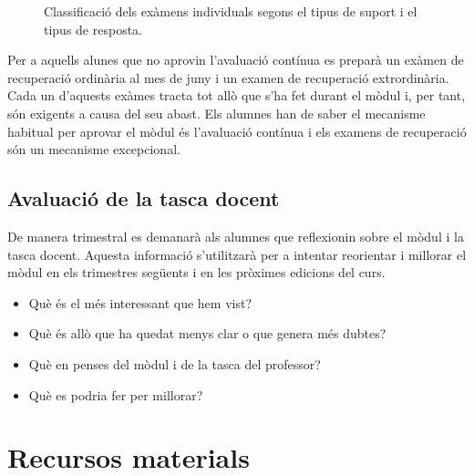 \documentclass[catalan, a4paper, 12pt, titlepage]{article}
\begin{document}
\begin{figure}
\centering
{}
\caption{Classificació dels exàmens individuals segons el tipus de suport i el tipus de resposta.} \label{fig:M1}
\end{figure}

Per a aquells alunes que no aprovin l'avaluació contínua es preparà un exàmen de recuperació ordinària al mes de juny i un examen de recuperació extrordinària. Cada un d'aquests exàmes tracta tot allò que s'ha fet durant el mòdul i, per tant, són exigents a causa del seu abast. Els alumnes han de saber el mecanisme habitual per aprovar el mòdul és l'avaluació contínua i els examens de recuperació són un mecanisme excepcional.

\subsection{Avaluació de la tasca docent}

De manera trimestral es demanarà als alumnes que reflexionin sobre el mòdul i la tasca docent. Aquesta informació s'utilitzarà per a intentar reorientar i millorar el mòdul en els trimestres següents i en les pròximes edicions del curs. 

\begin{itemize}
	\item Què és el més interessant que hem vist?
	\item Què és allò que ha quedat menys clar o que genera més dubtes?
	\item Què en penses del mòdul i de la tasca del professor?
	\item Què es podria fer per millorar?
\end{itemize}

\section{Recursos materials}
\end{document}
